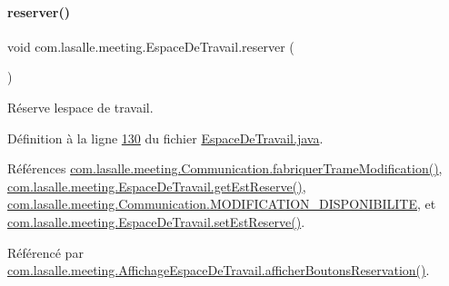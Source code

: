 \paragraph{\texorpdfstring{reserver()}{reserver()}}
{\footnotesize\ttfamily void com.\+lasalle.\+meeting.\+Espace\+De\+Travail.\+reserver (\begin{DoxyParamCaption}{ }\end{DoxyParamCaption})}



Réserve l\textquotesingle{}espace de travail. 



Définition à la ligne \hyperlink{_espace_de_travail_8java_source_l00130}{130} du fichier \hyperlink{_espace_de_travail_8java_source}{Espace\+De\+Travail.\+java}.



Références \hyperlink{_communication_8java_source_l00222}{com.\+lasalle.\+meeting.\+Communication.\+fabriquer\+Trame\+Modification()}, \hyperlink{_espace_de_travail_8java_source_l00117}{com.\+lasalle.\+meeting.\+Espace\+De\+Travail.\+get\+Est\+Reserve()}, \hyperlink{_communication_8java_source_l00058}{com.\+lasalle.\+meeting.\+Communication.\+M\+O\+D\+I\+F\+I\+C\+A\+T\+I\+O\+N\+\_\+\+D\+I\+S\+P\+O\+N\+I\+B\+I\+L\+I\+TE}, et \hyperlink{_espace_de_travail_8java_source_l00122}{com.\+lasalle.\+meeting.\+Espace\+De\+Travail.\+set\+Est\+Reserve()}.



Référencé par \hyperlink{_affichage_espace_de_travail_8java_source_l00150}{com.\+lasalle.\+meeting.\+Affichage\+Espace\+De\+Travail.\+afficher\+Boutons\+Reservation()}.


